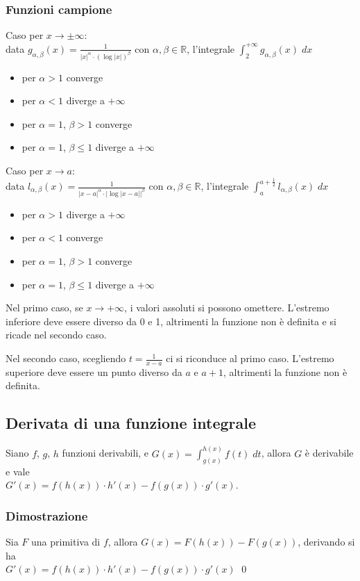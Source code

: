 \documentclass[a4paper]{article}
\begin{document}
\subsubsection*{Funzioni campione}
Caso per \(x \to \pm \infty\): \\
data \(\displaystyle g_{\alpha, \beta}(x) = \frac{1}{\left|x\right|^\alpha \cdot \left(\log \left|x\right|\right)^\beta}\) con \(\alpha, \beta \in \mathbb{R}\), l'integrale \(\displaystyle \int_{2}^{+\infty} g_{\alpha, \beta}(x) \; dx\)
\begin{itemize}
	\item per \(\alpha > 1\) converge
	\item per \(\alpha < 1\) diverge a \(+ \infty\)
	\item per \(\alpha = 1\), \(\beta > 1\) converge
	\item per \(\alpha = 1\), \(\beta \leq 1\) diverge a \(+ \infty\)
\end{itemize}
Caso per \(x \to a\): \\
data \(\displaystyle l_{\alpha, \beta}(x) = \frac{1}{\left|x-a\right|^\alpha \cdot \left|\log \left|x-a\right|\right|^\beta}\) con \(\alpha, \beta \in \mathbb{R}\), l'integrale \(\displaystyle \int_{a}^{a+\frac{1}{2}} l_{\alpha, \beta}(x) \; dx\)
\begin{itemize}
	\item per \(\alpha > 1\) diverge a \(+ \infty\)
	\item per \(\alpha < 1\) converge
	\item per \(\alpha = 1\), \(\beta > 1\) converge
	\item per \(\alpha = 1\), \(\beta \leq 1\) diverge a \(+ \infty\)
\end{itemize}

Nel primo caso, se \(x \to + \infty\), i valori assoluti si possono omettere. L'estremo inferiore deve essere diverso da 0 e 1,
altrimenti la funzione non è definita e si ricade nel secondo caso.

Nel secondo caso, scegliendo \(\displaystyle t = \frac{1}{x - a}\) ci si riconduce al primo caso. L'estremo superiore deve essere
un punto diverso da \(a\) e \(a+1\), altrimenti la funzione non è definita.

\subsection{Derivata di una funzione integrale}
Siano \(f\), \(g\), \(h\) funzioni derivabili, e \(\displaystyle G(x) = \int_{g(x)}^{h(x)} f(t) \; dt\), allora \(G\) è derivabile e vale \\
\(G'(x) = f(h(x)) \cdot h'(x) - f(g(x)) \cdot g'(x)\).

\subsubsection*{Dimostrazione}
Sia \(F\) una primitiva di \(f\), allora \(G(x) = F(h(x)) - F(g(x))\), derivando si ha \\ \(G'(x) = f(h(x)) \cdot h'(x) - f(g(x)) \cdot g'(x)\) \qed
\end{document}
